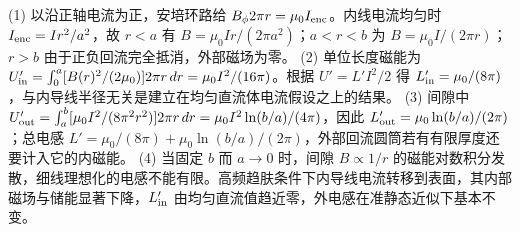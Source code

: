 (1) 以沿正轴电流为正，安培环路给 \(B_\phi 2\pi r=\mu_0I_{\rm enc}\)。内线电流均匀时 \(I_{\rm enc}=I r^2/a^2\)，故 \(r<a\) 有 \(B=\mu_0Ir/(2\pi a^2)\)；\(a<r<b\) 为 \(B=\mu_0I/(2\pi r)\)；\(r>b\) 由于正负回流完全抵消，外部磁场为零。
(2) 单位长度磁能为 \(U'_{\rm in}=\int_0^a[B(r)^2/(2\mu_0)]2\pi r\,dr=\mu_0I^2/(16\pi)\)。根据 \(U'=L'I^2/2\) 得 \(L'_{\rm in}=\mu_0/(8\pi)\)，与内导线半径无关是建立在均匀直流体电流假设之上的结果。
(3) 间隙中 \(U'_{\rm out}=\int_a^b[\mu_0I^2/(8\pi^2r^2)]2\pi r\,dr=\mu_0I^2\ln(b/a)/(4\pi)\)，因此 \(L'_{\rm out}=\mu_0\ln(b/a)/(2\pi)\)；总电感 \(L'=\mu_0/(8\pi)+\mu_0\ln(b/a)/(2\pi)\)，外部回流圆筒若有有限厚度还要计入它的内磁能。
(4) 当固定 \(b\) 而 \(a\to0\) 时，间隙 \(B\propto1/r\) 的磁能对数积分发散，细线理想化的电感不能有限。高频趋肤条件下内导线电流转移到表面，其内部磁场与储能显著下降，\(L'_{\rm in}\) 由均匀直流值趋近零，外电感在准静态近似下基本不变。
